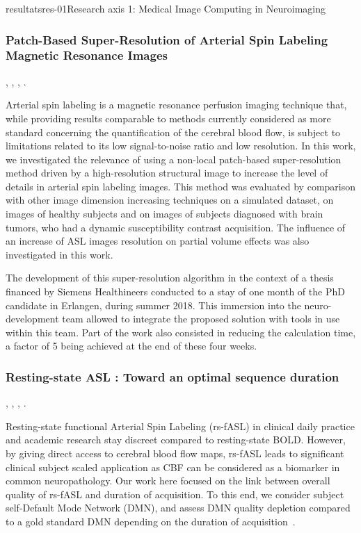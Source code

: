 \documentclass{ra2018}
\begin{document}
\begin{module}{resultats}{res-01}{Research axis 1: Medical Image Computing in Neuroimaging}
\subsubsection{Patch-Based Super-Resolution of Arterial Spin Labeling Magnetic Resonance Images}
\begin{participants}
      , 
      , 
      ,
      .
\end{participants}
Arterial spin labeling is a magnetic resonance perfusion imaging technique that, while providing results comparable to methods currently considered as more standard concerning the quantification of the cerebral blood flow, is subject to limitations related to its low signal-to-noise ratio and low resolution. In this work, we investigated the relevance of using a non-local patch-based super-resolution method driven by a high-resolution structural image to increase the level of details in arterial spin labeling images. This method was evaluated by comparison with other image dimension increasing techniques on a simulated dataset, on images of healthy subjects and on images of subjects diagnosed with brain tumors, who had a dynamic susceptibility contrast acquisition. The influence of an increase of ASL images resolution on partial volume effects was also investigated in this work.~\cite{meuree:inserm-01880726}

The development of this super-resolution algorithm in the context of a thesis financed by Siemens Healthineers conducted to a stay of one month of the PhD candidate in Erlangen, during summer 2018. This immersion into the neuro-development team allowed to integrate the proposed solution with tools in use within this team. Part of the work also consisted in reducing the calculation time, a factor of 5 being achieved at the end of these four weeks.

\subsubsection{Resting-state ASL : Toward an optimal sequence duration}
\begin{participants}
      ,
      , 
      ,
      .
\end{participants}
Resting-state functional Arterial Spin Labeling (rs-fASL) in clinical daily practice and academic research stay discreet compared to resting-state BOLD. However, by giving direct access to cerebral blood flow maps, rs-fASL leads to significant clinical subject scaled application as CBF can be considered as a biomarker in common neuropathology. Our work here focused on the link between overall quality of rs-fASL and duration of acquisition. To this end, we consider subject self-Default Mode Network (DMN), and assess DMN quality depletion compared to a gold standard DMN depending on the duration of acquisition~\cite{vallee:inserm-01935089}.



\end{module}
\end{document}
